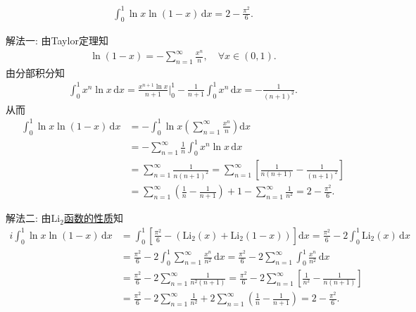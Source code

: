 \documentclass[../../main.tex]{subfiles}%
\begin{document}
\begin{example}
\begin{align*}
\int_{0}^{1} \ln x \ln(1-x) \, \mathrm{d}x = 2 - \frac{\pi^2}{6}.
\end{align*}
\end{example}
\begin{solution}

{\color{blue}解法一:} 由Taylor定理知
\begin{align*}
\ln(1-x) = -\sum\limits_{n=1}^{\infty}\frac{x^n}{n},\quad \forall x\in(0,1).
\end{align*}
由分部积分知
\begin{align*}
\int_0^1 x^n\ln x\,\mathrm{d}x
= \frac{x^{n+1}\ln x}{n+1}\Big|_0^1 - \frac{1}{n+1}\int_0^1 x^n\,\mathrm{d}x
= -\frac{1}{(n+1)^2}.
\end{align*}
从而
\begin{align*}
\int_0^1 \ln x\ln(1-x)\,\mathrm{d}x
&= -\int_0^1 \ln x\left(\sum\limits_{n=1}^{\infty}\frac{x^n}{n}\right)\mathrm{d}x \\
&= -\sum\limits_{n=1}^{\infty}\frac{1}{n}\int_0^1 x^n\ln x\,\mathrm{d}x \\
&= \sum\limits_{n=1}^{\infty}\frac{1}{n(n+1)^2}
= \sum\limits_{n=1}^{\infty}\left[\frac{1}{n(n+1)}-\frac{1}{(n+1)^2}\right] \\
&= \sum\limits_{n=1}^{\infty}\left(\frac{1}{n}-\frac{1}{n+1}\right)+1-\sum\limits_{n=1}^{\infty}\frac{1}{n^2}
= 2-\frac{\pi^2}{6}.
\end{align*}

{\color{blue}解法二:} 由\hyperref[proposition:Li_2函数的性质]{$\mathrm{Li}_2$函数的性质}知
\begin{align*}i
\int_0^1 \ln x\ln(1-x)\,\mathrm{d}x
&= \int_0^1 \left[\frac{\pi^2}{6}-\left(\mathrm{Li}_2(x)+\mathrm{Li}_2(1-x)\right)\right]\mathrm{d}x = \frac{\pi^2}{6}-2\int_0^1 \mathrm{Li}_2(x)\,\mathrm{d}x \\
&= \frac{\pi^2}{6}-2\int_0^1 \sum\limits_{n=1}^{\infty}\frac{x^n}{n^2}\,\mathrm{d}x = \frac{\pi^2}{6}-2\sum\limits_{n=1}^{\infty}\int_0^1 \frac{x^n}{n^2}\,\mathrm{d}x \\
&= \frac{\pi^2}{6}-2\sum\limits_{n=1}^{\infty}\frac{1}{n^2(n+1)} = \frac{\pi^2}{6}-2\sum\limits_{n=1}^{\infty}\left[\frac{1}{n^2}-\frac{1}{n(n+1)}\right] \\
&= \frac{\pi^2}{6}-2\sum\limits_{n=1}^{\infty}\frac{1}{n^2}
+2\sum\limits_{n=1}^{\infty}\left(\frac{1}{n}-\frac{1}{n+1}\right)
= 2-\frac{\pi^2}{6}.
\end{align*}
\end{solution}
\end{document}
